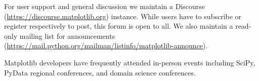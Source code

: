 \documentclass[12pt]{article}
\numberwithin{page}{section}
\begin{document}
For user support and general discussion we maintain a Discourse
(\url{https://discourse.matplotlib.org}) instance.  While users have to
subscribe or register respectively to post, this forum is open to all.  We also
maintain a read-only mailing list for announcements
(\url{https://mail.python.org/mailman/listinfo/matplotlib-announce}).

Matplotlib developers have frequently attended in-person events including
SciPy, PyData regional conferences, and domain science conferences.

\newpage

\def\ref@jnl#1{{\rm#1}}

\def\aj{\ref@jnl{AJ}}                   %
\def\actaa{\ref@jnl{Acta Astron.}}      %
\def\araa{\ref@jnl{ARA\&A}}             %
\def\apj{\ref@jnl{ApJ}}                 %
\def\apjl{\ref@jnl{ApJ}}                %
\def\apjs{\ref@jnl{ApJS}}               %
\def\ao{\ref@jnl{Appl.~Opt.}}           %
\def\apss{\ref@jnl{Ap\&SS}}             %
\def\aap{\ref@jnl{A\&A}}                %
\def\aapr{\ref@jnl{A\&A~Rev.}}          %
\def\aaps{\ref@jnl{A\&AS}}              %
\def\azh{\ref@jnl{AZh}}                 %
\def\baas{\ref@jnl{BAAS}}               %
\def\bac{\ref@jnl{Bull. astr. Inst. Czechosl.}}
\def\caa{\ref@jnl{Chinese Astron. Astrophys.}}
\def\cjaa{\ref@jnl{Chinese J. Astron. Astrophys.}}
\def\icarus{\ref@jnl{Icarus}}           %
\def\jcap{\ref@jnl{J. Cosmology Astropart. Phys.}}
\def\jrasc{\ref@jnl{JRASC}}             %
\def\memras{\ref@jnl{MmRAS}}            %
\def\mnras{\ref@jnl{MNRAS}}             %
\def\na{\ref@jnl{New A}}                %
\def\nar{\ref@jnl{New A Rev.}}          %
\def\pra{\ref@jnl{Phys.~Rev.~A}}        %
\def\prb{\ref@jnl{Phys.~Rev.~B}}        %
\end{document}
